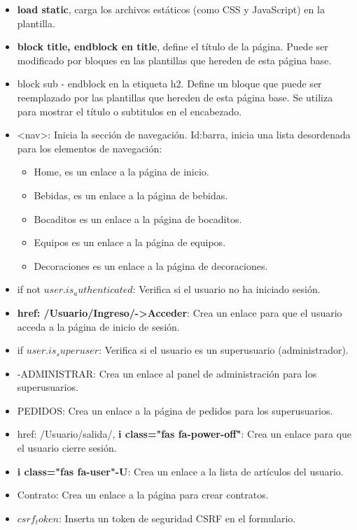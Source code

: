 \documentclass{article}
\begin{document}
	\begin{itemize}
	    \item \textbf{load static}, carga los archivos estáticos (como CSS y JavaScript) en la plantilla.
        \item \textbf{block title, endblock en title}, define el título de la página. Puede ser modificado por bloques en las plantillas que hereden de esta página base.
        \item block sub - endblock en la etiqueta h2. Define un bloque que puede ser reemplazado por las plantillas que hereden de esta página base. Se utiliza para mostrar el título o subtitulos en el encabezado.
        \item <nav>: Inicia la sección de navegación. Id:barra, inicia una lista desordenada para los elementos de navegación:
        \begin{itemize}
            \item Home, es un enlace a la página de inicio.
            \item Bebidas, es un enlace a la página de bebidas.
            \item Bocaditos es un enlace a la página de bocaditos.
            \item Equipos es un enlace a la página de equipos.
            \item Decoraciones es un enlace a la página de decoraciones.
        \end{itemize}
    \item if not $user.is_authenticated$: Verifica si el usuario no ha iniciado sesión.
    \item \textbf{href: /Usuario/Ingreso/->Acceder}: Crea un enlace para que el usuario acceda a la página de inicio de sesión.
    \item if $user.is_superuser$: Verifica si el usuario es un superusuario (administrador).
    \item -ADMINISTRAR: Crea un enlace al panel de administración para los superusuarios.
    \item PEDIDOS: Crea un enlace a la página de pedidos para los superusuarios.
    \item href: /Usuario/salida/, \textbf{i class="fas fa-power-off"}: Crea un enlace para que el usuario cierre sesión.
    \item \textbf{i class="fas fa-user"-U}: Crea un enlace a la lista de artículos del usuario.
    \item Contrato: Crea un enlace a la página para crear contratos.
    \item $csrf_token$: Inserta un token de seguridad CSRF en el formulario.

\end{itemize}
\end{document}
